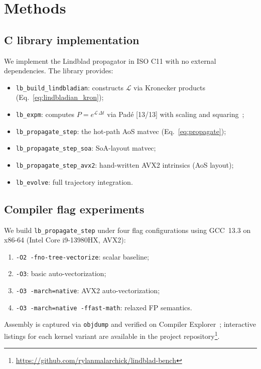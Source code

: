 \documentclass[a4paper,noarxiv]{quantumarticle}
\begin{document}
\section{Methods}
\label{sec:methods}

\subsection{C library implementation}
\label{sec:impl}

We implement the Lindblad propagator in ISO C11 with no external
dependencies. The library provides:
\begin{itemize}
  \item \texttt{lb\_build\_lindbladian}: constructs $\mathcal{L}$ via
        Kronecker products (Eq.~\eqref{eq:lindbladian_kron});
  \item \texttt{lb\_expm}: computes $P = e^{\mathcal{L}\,\Delta t}$ via
        Pad\'{e} [13/13] with scaling and squaring~\cite{Higham2005};
  \item \texttt{lb\_propagate\_step}: the hot-path AoS matvec
        (Eq.~\eqref{eq:propagate});
  \item \texttt{lb\_propagate\_step\_soa}: SoA-layout matvec;
  \item \texttt{lb\_propagate\_step\_avx2}: hand-written AVX2 intrinsics
        (AoS layout);
  \item \texttt{lb\_evolve}: full trajectory integration.
\end{itemize}

\subsection{Compiler flag experiments}
\label{sec:flags}

We build \texttt{lb\_propagate\_step} under four flag configurations using
GCC~13.3 on x86-64 (Intel Core i9-13980HX, AVX2):
\begin{enumerate}
  \item \texttt{-O2 -fno-tree-vectorize}: scalar baseline;
  \item \texttt{-O3}: basic auto-vectorization;
  \item \texttt{-O3 -march=native}: AVX2 auto-vectorization;
  \item \texttt{-O3 -march=native -ffast-math}: relaxed FP semantics.
\end{enumerate}
Assembly is captured via \texttt{objdump} and verified on Compiler
Explorer~\cite{Godbolt}; interactive listings for each kernel variant
are available in the project repository\footnote{%
\url{https://github.com/rylanmalarchick/lindblad-bench}}.
\end{document}
